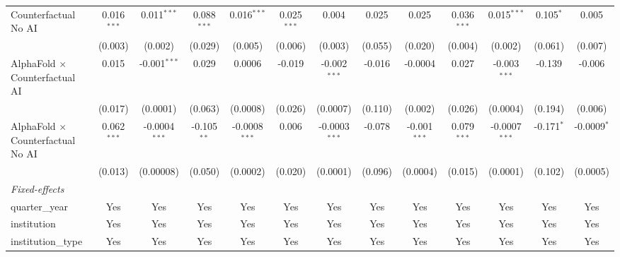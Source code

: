 \begin{tabular}{lcccccccccccc}
   Counterfactual No AI                     & 0.016$^{***}$ & 0.011$^{***}$   & 0.088$^{***}$ & 0.016$^{***}$   & 0.025$^{***}$ & 0.004           & 0.025         & 0.025          & 0.036$^{***}$ & 0.015$^{***}$   & 0.105$^{*}$  & 0.005\\   
                                            & (0.003)       & (0.002)         & (0.029)       & (0.005)         & (0.006)       & (0.003)         & (0.055)       & (0.020)        & (0.004)       & (0.002)         & (0.061)      & (0.007)\\   
   AlphaFold $\times$ Counterfactual AI     & 0.015         & -0.001$^{***}$  & 0.029         & 0.0006          & -0.019        & -0.002$^{***}$  & -0.016        & -0.0004        & 0.027         & -0.003$^{***}$  & -0.139       & -0.006\\   
                                            & (0.017)       & (0.0001)        & (0.063)       & (0.0008)        & (0.026)       & (0.0007)        & (0.110)       & (0.002)        & (0.026)       & (0.0004)        & (0.194)      & (0.006)\\   
   AlphaFold $\times$ Counterfactual No AI  & 0.062$^{***}$ & -0.0004$^{***}$ & -0.105$^{**}$ & -0.0008$^{***}$ & 0.006         & -0.0003$^{***}$ & -0.078        & -0.001$^{***}$ & 0.079$^{***}$ & -0.0007$^{***}$ & -0.171$^{*}$ & -0.0009$^{*}$\\   
                                            & (0.013)       & (0.00008)       & (0.050)       & (0.0002)        & (0.020)       & (0.0001)        & (0.096)       & (0.0004)       & (0.015)       & (0.0001)        & (0.102)      & (0.0005)\\   
   \midrule
   \emph{Fixed-effects}\\
   quarter\_year                            & Yes           & Yes             & Yes           & Yes             & Yes           & Yes             & Yes           & Yes            & Yes           & Yes             & Yes          & Yes\\  
   institution                              & Yes           & Yes             & Yes           & Yes             & Yes           & Yes             & Yes           & Yes            & Yes           & Yes             & Yes          & Yes\\  
   institution\_type                        & Yes           & Yes             & Yes           & Yes             & Yes           & Yes             & Yes           & Yes            & Yes           & Yes             & Yes          & Yes\\  

\end{tabular}
